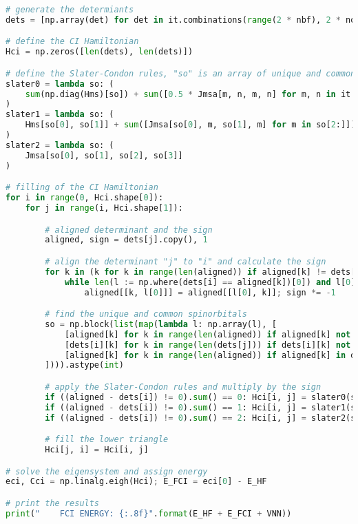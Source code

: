 \raggedbottom\begin{lstlisting}[language=Python, caption={\acrshort{ci} exercise code solution.}, label=code:ci_solution]
# generate the determiants
dets = [np.array(det) for det in it.combinations(range(2 * nbf), 2 * nocc)]

# define the CI Hamiltonian
Hci = np.zeros([len(dets), len(dets)])

# define the Slater-Condon rules, "so" is an array of unique and common spinorbitals
slater0 = lambda so: (
    sum(np.diag(Hms)[so]) + sum([0.5 * Jmsa[m, n, m, n] for m, n in it.product(so, so)])
)
slater1 = lambda so: (
    Hms[so[0], so[1]] + sum([Jmsa[so[0], m, so[1], m] for m in so[2:]])
)
slater2 = lambda so: (
    Jmsa[so[0], so[1], so[2], so[3]]
)

# filling of the CI Hamiltonian
for i in range(0, Hci.shape[0]):
    for j in range(i, Hci.shape[1]):

        # aligned determinant and the sign
        aligned, sign = dets[j].copy(), 1

        # align the determinant "j" to "i" and calculate the sign
        for k in (k for k in range(len(aligned)) if aligned[k] != dets[i][k]):
            while len(l := np.where(dets[i] == aligned[k])[0]) and l[0] != k:
                aligned[[k, l[0]]] = aligned[[l[0], k]]; sign *= -1

        # find the unique and common spinorbitals
        so = np.block(list(map(lambda l: np.array(l), [
            [aligned[k] for k in range(len(aligned)) if aligned[k] not in dets[i]],
            [dets[i][k] for k in range(len(dets[j])) if dets[i][k] not in aligned],
            [aligned[k] for k in range(len(aligned)) if aligned[k] in dets[i]]
        ]))).astype(int)

        # apply the Slater-Condon rules and multiply by the sign
        if ((aligned - dets[i]) != 0).sum() == 0: Hci[i, j] = slater0(so) * sign
        if ((aligned - dets[i]) != 0).sum() == 1: Hci[i, j] = slater1(so) * sign
        if ((aligned - dets[i]) != 0).sum() == 2: Hci[i, j] = slater2(so) * sign

        # fill the lower triangle
        Hci[j, i] = Hci[i, j]

# solve the eigensystem and assign energy
eci, Cci = np.linalg.eigh(Hci); E_FCI = eci[0] - E_HF

# print the results
print("    FCI ENERGY: {:.8f}".format(E_HF + E_FCI + VNN))
\end{lstlisting}

